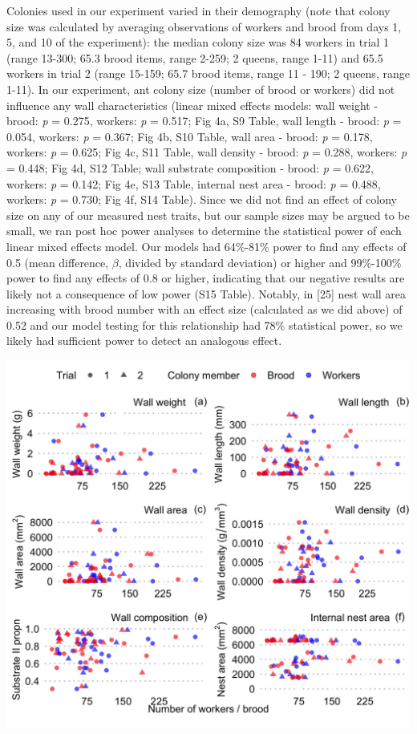 \documentclass[3p]{elsarticle} %
\begin{document}
Colonies used in our experiment varied in their demography (note that
colony size was calculated by averaging observations of workers and
brood from days 1, 5, and 10 of the experiment): the median colony size
was 84 workers in trial 1 (range 13-300; 65.3 brood items, range 2-259;
2 queens, range 1-11) and 65.5 workers in trial 2 (range 15-159; 65.7
brood items, range 11 - 190; 2 queens, range 1-11). In our experiment,
ant colony size (number of brood or workers) did not influence any wall
characteristics (linear mixed effects models: wall weight - brood:
\emph{p} = 0.275, workers: \emph{p} = 0.517; Fig 4a, S9 Table, wall
length - brood: \emph{p} = 0.054, workers: \emph{p} = 0.367; Fig 4b, S10
Table, wall area - brood: \emph{p} = 0.178, workers: \emph{p} = 0.625;
Fig 4c, S11 Table, wall density - brood: \emph{p} = 0.288, workers:
\emph{p} = 0.448; Fig 4d, S12 Table; wall substrate composition - brood:
\emph{p} = 0.622, workers: \emph{p} = 0.142; Fig 4e, S13 Table, internal
nest area - brood: \emph{p} = 0.488, workers: \emph{p} = 0.730; Fig 4f,
S14 Table). Since we did not find an effect of colony size on any of our
measured nest traits, but our sample sizes may be argued to be small, we
ran post hoc power analyses to determine the statistical power of each
linear mixed effects model. Our models had 64\%-81\% power to find any
effects of 0.5 (mean difference, \(\beta\), divided by standard
deviation) or higher and 99\%-100\% power to find any effects of 0.8 or
higher, indicating that our negative results are likely not a
consequence of low power (S15 Table). Notably, in {[}25{]} nest wall
area increasing with brood number with an effect size (calculated as we
did above) of 0.52 and our model testing for this relationship had 78\%
statistical power, so we likely had sufficient power to detect an
analogous effect.

\begin{flushleft}\includegraphics[width=1\linewidth,height=0.75\textheight]{../figures/Fig4} \end{flushleft}
\end{document}
